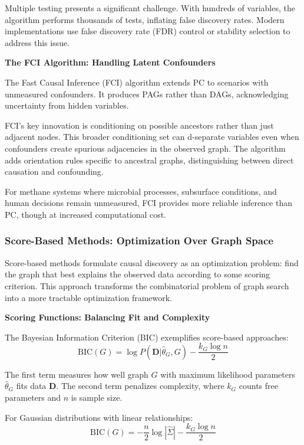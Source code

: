 Multiple testing presents a significant challenge. With hundreds of variables, the algorithm performs thousands of tests, inflating false discovery rates. Modern implementations use false discovery rate (FDR) control or stability selection to address this issue.

\textbf{The FCI Algorithm: Handling Latent Confounders}

The Fast Causal Inference (FCI) algorithm extends PC to scenarios with unmeasured confounders. It produces PAGs rather than DAGs, acknowledging uncertainty from hidden variables.

FCI's key innovation is conditioning on possible ancestors rather than just adjacent nodes. This broader conditioning set can d-separate variables even when confounders create spurious adjacencies in the observed graph. The algorithm adds orientation rules specific to ancestral graphs, distinguishing between direct causation and confounding.

For methane systems where microbial processes, subsurface conditions, and human decisions remain unmeasured, FCI provides more reliable inference than PC, though at increased computational cost.

\subsubsection{Score-Based Methods: Optimization Over Graph Space}

Score-based methods formulate causal discovery as an optimization problem: find the graph that best explains the observed data according to some scoring criterion. This approach transforms the combinatorial problem of graph search into a more tractable optimization framework.

\textbf{Scoring Functions: Balancing Fit and Complexity}

The Bayesian Information Criterion (BIC) exemplifies score-based approaches:
\begin{equation}
\text{BIC}(G) = \log P(\mathbf{D}|\hat{\theta}_G, G) - \frac{k_G \log n}{2}
\end{equation}

The first term measures how well graph $G$ with maximum likelihood parameters $\hat{\theta}_G$ fits data $\mathbf{D}$. The second term penalizes complexity, where $k_G$ counts free parameters and $n$ is sample size.

For Gaussian distributions with linear relationships:
\begin{equation}
\text{BIC}(G) = -\frac{n}{2} \log|\hat{\Sigma}| - \frac{k_G \log n}{2}
\end{equation}

